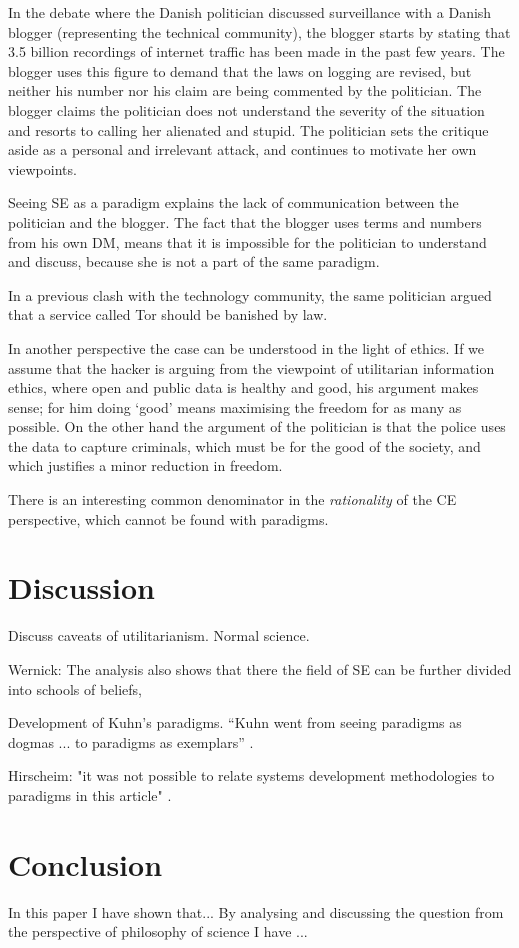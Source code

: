 \documentclass{article}
\begin{document}
In the debate where the Danish politician discussed surveillance with a Danish blogger (representing the technical community), the blogger starts by stating that 3.5 billion recordings of internet traffic has been made in the past few years. The blogger uses this figure to demand that the laws on logging are revised, but neither his number nor his claim are being commented by the politician. The blogger claims the politician does not understand the severity of the situation and resorts to calling her alienated and stupid. The politician sets the critique aside as a personal and irrelevant attack, and continues to motivate her own viewpoints.

Seeing SE as a paradigm explains the lack of communication between the politician and the blogger. The fact that the blogger uses terms and numbers from his own DM, means that it is impossible for the politician to understand and discuss, because she is not a part of the same paradigm.

In a previous clash with the technology community, the same politician argued that a service called Tor should be banished by law.

In another perspective the case can be understood in the light of ethics. If we assume that the hacker is arguing from the viewpoint of utilitarian information ethics, where open and public data is healthy and good, his argument makes sense; for him doing `good' means maximising the freedom for as many as possible. On the other hand the argument of the politician is that the police uses the data to capture criminals, which must be for the good of the society, and which justifies a minor reduction in freedom. 

There is an interesting common denominator in the \textit{rationality} of the CE perspective, which cannot be found with paradigms.

\section{Discussion} \label{Discussion}
Discuss caveats of utilitarianism.
Normal science.

Wernick: The analysis also shows that there the field of SE can be further divided into schools of beliefs, 

Development of Kuhn's paradigms. ``Kuhn went from seeing paradigms as dogmas ... to paradigms as exemplars'' \citep[p. 49]{Banville:1989}.

Hirscheim: "it was not possible to relate systems development methodologies to paradigms in this article" \citep[p. 1214]{Hirschheim:1989}.

\section{Conclusion}
In this paper I have shown that...
By analysing and discussing the question from the perspective
of philosophy of science I have ...



\end{document}
